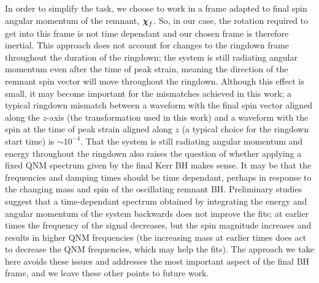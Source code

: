 In order to simplify the task, we choose to work in a frame adapted to final spin angular momentum of the remnant, $\vb*{\chi}_f$.
So, in our case, the rotation required to get into this frame is not time dependant and our chosen frame is therefore inertial.
This approach does not account for changes to the ringdown frame throughout the duration of the ringdown; the system is still radiating angular momentum even after the time of peak strain, meaning the direction of the remnant spin vector will move throughout the ringdown. 
Although this effect is small, it may become important for the mismatches achieved in this work; a typical ringdown mismatch between a waveform with the final spin vector aligned along the $z$-axis (the transformation used in this work) and a waveform with the spin at the time of peak strain aligned along $z$ (a typical choice for the ringdown start time) is $\sim 10^{-4}$.
That the system is still radiating angular momentum and energy throughout the ringdown also raises the question of whether applying a fixed QNM spectrum given by the final Kerr BH makes sense.
It may be that the frequencies and damping times should be time dependant, perhaps in response to the changing mass and spin of the oscillating remnant BH.
Preliminary studies suggest that a time-dependant spectrum obtained by integrating the energy and angular momentum of the system backwards does not improve the fits; at earlier times the frequency of the signal decreases, but the spin magnitude increases and results in higher QNM frequencies (the increasing mass at earlier times does act to decrease the QNM frequencies, which may help the fits).
The approach we take here avoids these issues and addresses the most important aspect of the final BH frame, and we leave these other points to future work.

